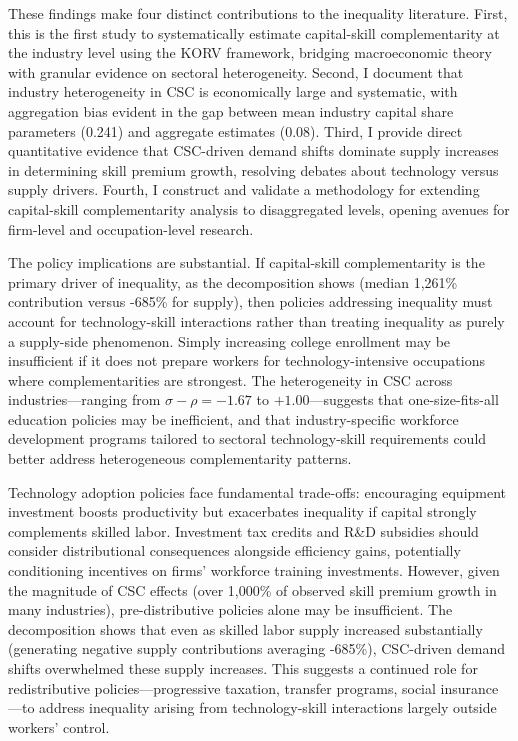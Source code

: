 \documentclass[12pt]{article}
\begin{document}
These findings make four distinct contributions to the inequality literature. First, this is the first study to systematically estimate capital-skill complementarity at the industry level using the KORV framework, bridging macroeconomic theory with granular evidence on sectoral heterogeneity. Second, I document that industry heterogeneity in CSC is economically large and systematic, with aggregation bias evident in the gap between mean industry capital share parameters (0.241) and aggregate estimates (0.08). Third, I provide direct quantitative evidence that CSC-driven demand shifts dominate supply increases in determining skill premium growth, resolving debates about technology versus supply drivers. Fourth, I construct and validate a methodology for extending capital-skill complementarity analysis to disaggregated levels, opening avenues for firm-level and occupation-level research.

The policy implications are substantial. If capital-skill complementarity is the primary driver of inequality, as the decomposition shows (median 1,261\% contribution versus -685\% for supply), then policies addressing inequality must account for technology-skill interactions rather than treating inequality as purely a supply-side phenomenon. Simply increasing college enrollment may be insufficient if it does not prepare workers for technology-intensive occupations where complementarities are strongest. The heterogeneity in CSC across industries---ranging from $\sigma - \rho = -1.67$ to $+1.00$---suggests that one-size-fits-all education policies may be inefficient, and that industry-specific workforce development programs tailored to sectoral technology-skill requirements could better address heterogeneous complementarity patterns.

Technology adoption policies face fundamental trade-offs: encouraging equipment investment boosts productivity but exacerbates inequality if capital strongly complements skilled labor. Investment tax credits and R\&D subsidies should consider distributional consequences alongside efficiency gains, potentially conditioning incentives on firms' workforce training investments. However, given the magnitude of CSC effects (over 1,000\% of observed skill premium growth in many industries), pre-distributive policies alone may be insufficient. The decomposition shows that even as skilled labor supply increased substantially (generating negative supply contributions averaging -685\%), CSC-driven demand shifts overwhelmed these supply increases. This suggests a continued role for redistributive policies---progressive taxation, transfer programs, social insurance---to address inequality arising from technology-skill interactions largely outside workers' control.
\end{document}
